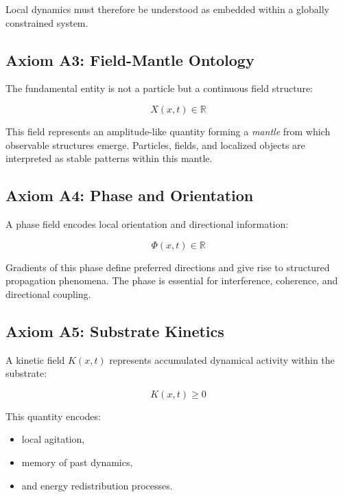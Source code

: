 \documentclass[11pt]{article}
\begin{document}
Local dynamics must therefore be understood as embedded within a globally constrained system.

\subsection{Axiom A3: Field-Mantle Ontology}

The fundamental entity is not a particle but a continuous field structure:

\begin{equation}
X(x,t) \in \mathbb{R}
\end{equation}

This field represents an amplitude-like quantity forming a \emph{mantle} from which observable structures emerge. Particles, fields, and localized objects are interpreted as stable patterns within this mantle.

\subsection{Axiom A4: Phase and Orientation}

A phase field encodes local orientation and directional information:

\begin{equation}
\Phi(x,t) \in \mathbb{R}
\end{equation}

Gradients of this phase define preferred directions and give rise to structured propagation phenomena. The phase is essential for interference, coherence, and directional coupling.

\subsection{Axiom A5: Substrate Kinetics}

A kinetic field $K(x,t)$ represents accumulated dynamical activity within the substrate:

\begin{equation}
K(x,t) \geq 0
\end{equation}

This quantity encodes:
\begin{itemize}
\item local agitation,
\item memory of past dynamics,
\item and energy redistribution processes.
\end{itemize}
\end{document}

